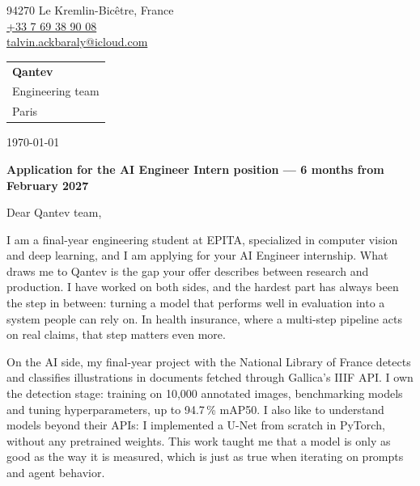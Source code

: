 \documentclass[11pt, a4paper]{extarticle}
\begin{document}
{\color{accent}\fontsize{22}{26}\selectfont\scshape{}}\par\vspace{3pt}
{\setlength{\parskip}{0pt}
94270 Le Kremlin-Bicêtre, France\\
\href{tel:+33769389008}{\textcolor{ink}{+33 7 69 38 90 08}}\\
\href{mailto:talvin.ackbaraly@icloud.com}{\textcolor{ink}{talvin.ackbaraly@icloud.com}}\par}
\vspace{-4pt}{\color{hair}\rule{\textwidth}{0.4pt}}\par

\vspace{2pt}
\hfill\begin{tabular}[t]{@{}l@{}}
  \textbf{Qantev}\\
  Engineering team\\
  Paris
\end{tabular}

\today

\vspace{2pt}
\textbf{Application for the AI Engineer Intern position — 6 months from February 2027}

\vspace{2pt}
Dear Qantev team,

\justifying
I am a final-year engineering student at EPITA, specialized in computer vision and deep learning,
and I am applying for your AI Engineer internship. What draws me to Qantev is the gap your offer
describes between research and production. I have worked on both sides, and the hardest part has
always been the step in between: turning a model that performs well in evaluation into a system
people can rely on. In health insurance, where a multi-step pipeline acts on real claims, that step
matters even more.

On the AI side, my final-year project with the National Library of France detects and classifies
illustrations in documents fetched through Gallica's IIIF API. I own the detection stage: training
on 10,000 annotated images, benchmarking models and tuning hyperparameters, up to 94.7\,\% mAP50.
I also like to understand models beyond their APIs: I implemented a U-Net from scratch in PyTorch,
without any pretrained weights. This work taught me that a model is only as good as the way it is measured, which is just as true when
iterating on prompts and agent behavior.
\end{document}
